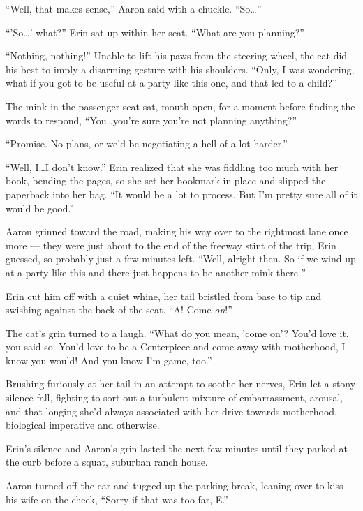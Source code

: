 \documentclass[12pt,letterpaper,oneside]{memoir}
\begin{document}
  ``Well, that makes sense,'' Aaron said with a chuckle. ``So\ldots{}''

  ``'So\ldots{}' what?'' Erin sat up within her seat. ``What are you planning?''

  ``Nothing, nothing!'' Unable to lift his paws from the steering wheel, the cat did his best to imply a disarming gesture with his shoulders. ``Only, I was wondering, what if you got to be useful at a party like this one, and that led to a child?''

  The mink in the passenger seat sat, mouth open, for a moment before finding the words to respond, ``You\ldots{}you're sure you're not planning anything?''

  ``Promise. No plans, or we'd be negotiating a hell of a lot harder.''

  ``Well, I\ldots{}I don't know.'' Erin realized that she was fiddling too much with her book, bending the pages, so she set her bookmark in place and slipped the paperback into her bag. ``It would be a lot to process. But I'm pretty sure all of it would be good.''

  Aaron grinned toward the road, making his way over to the rightmost lane once more --- they were just about to the end of the freeway stint of the trip, Erin guessed, so probably just a few minutes left. ``Well, alright then. So if we wind up at a party like this and there just happens to be another mink there-''

  Erin cut him off with a quiet whine, her tail bristled from base to tip and swishing against the back of the seat. ``A! Come \textit{on}!''

  The cat's grin turned to a laugh. ``What do you mean, 'come on'? You'd love it, you said so. You'd love to be a Centerpiece and come away with motherhood, I know you would! And you know I'm game, too.''

  Brushing furiously at her tail in an attempt to soothe her nerves, Erin let a stony silence fall, fighting to sort out a turbulent mixture of embarrassment, arousal, and that longing she'd always associated with her drive towards motherhood, biological imperative and otherwise.

  Erin's silence and Aaron's grin lasted the next few minutes until they parked at the curb before a squat, suburban ranch house.

  Aaron turned off the car and tugged up the parking break, leaning over to kiss his wife on the cheek, ``Sorry if that was too far, E.''
\end{document}
